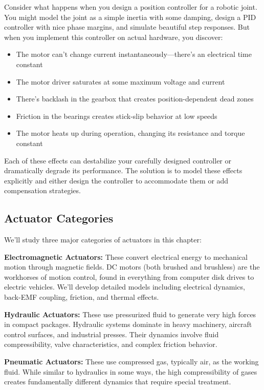 Consider what happens when you design a position controller for a robotic joint. You might model the joint as a simple inertia with some damping, design a PID controller with nice phase margins, and simulate beautiful step responses. But when you implement this controller on actual hardware, you discover:

\begin{itemize}
    \item The motor can't change current instantaneously---there's an electrical time constant
    \item The motor driver saturates at some maximum voltage and current
    \item There's backlash in the gearbox that creates position-dependent dead zones
    \item Friction in the bearings creates stick-slip behavior at low speeds
    \item The motor heats up during operation, changing its resistance and torque constant
\end{itemize}

Each of these effects can destabilize your carefully designed controller or dramatically degrade its performance. The solution is to model these effects explicitly and either design the controller to accommodate them or add compensation strategies.

\subsection{Actuator Categories}

We'll study three major categories of actuators in this chapter:

\textbf{Electromagnetic Actuators:} These convert electrical energy to mechanical motion through magnetic fields. DC motors (both brushed and brushless) are the workhorses of motion control, found in everything from computer disk drives to electric vehicles. We'll develop detailed models including electrical dynamics, back-EMF coupling, friction, and thermal effects.

\textbf{Hydraulic Actuators:} These use pressurized fluid to generate very high forces in compact packages. Hydraulic systems dominate in heavy machinery, aircraft control surfaces, and industrial presses. Their dynamics involve fluid compressibility, valve characteristics, and complex friction behavior.

\textbf{Pneumatic Actuators:} These use compressed gas, typically air, as the working fluid. While similar to hydraulics in some ways, the high compressibility of gases creates fundamentally different dynamics that require special treatment.

